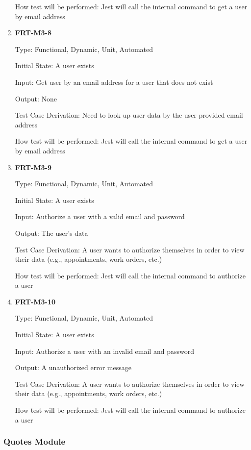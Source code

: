 \documentclass[12pt, titlepage]{article}
\begin{document}
\begin{enumerate}
	      How test will be performed: Jest will call the internal command to get a user by email address

	\item \textbf{FRT-M3-8}

	      Type: Functional, Dynamic, Unit, Automated

	      Initial State: A user exists

	      Input: Get user by an email address for a user that does not exist

	      Output: None

	      Test Case Derivation: Need to look up user data by the user provided email address

	      How test will be performed: Jest will call the internal command to get a user by email address

	\item \textbf{FRT-M3-9}

	      Type: Functional, Dynamic, Unit, Automated

	      Initial State: A user exists

	      Input: Authorize a user with a valid email and password

	      Output: The user's data

	      Test Case Derivation: A user wants to authorize themselves in order to view their data (e.g.,
	      appointments, work orders, etc.)

	      How test will be performed: Jest will call the internal command to authorize a user

	\item \textbf{FRT-M3-10}

	      Type: Functional, Dynamic, Unit, Automated

	      Initial State: A user exists

	      Input: Authorize a user with an invalid email and password

	      Output: A unauthorized error message

	      Test Case Derivation: A user wants to authorize themselves in order to view their data (e.g.,
	      appointments, work orders, etc.)

	      How test will be performed: Jest will call the internal command to authorize a user

\end{enumerate}

\subsubsection{Quotes Module}
\end{document}
